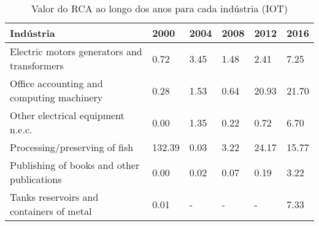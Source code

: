 \begin{table}
\centering
\caption{Valor do RCA ao longo dos anos para cada indústria (IOT)}
\label{tab:ex3-tempo-IOT}
\begin{tabular}{p{6cm}p{1.5cm}p{1.5cm}p{1.5cm}p{1.5cm}p{1.5cm}}
\toprule
                                  Indústria &   2000 & 2004 & 2008 &  2012 &  2016 \\
\midrule
Electric motors generators and transformers &   0.72 & 3.45 & 1.48 &  2.41 &  7.25 \\
  Office accounting and computing machinery &   0.28 & 1.53 & 0.64 & 20.93 & 21.70 \\
          Other electrical equipment n.e.c. &   0.00 & 1.35 & 0.22 &  0.72 &  6.70 \\
              Processing/preserving of fish & 132.39 & 0.03 & 3.22 & 24.17 & 15.77 \\
 Publishing of books and other publications &   0.00 & 0.02 & 0.07 &  0.19 &  3.22 \\
   Tanks reservoirs and containers of metal &   0.01 &    - &    - &     - &  7.33 \\
\bottomrule
\end{tabular}
\end{table}
